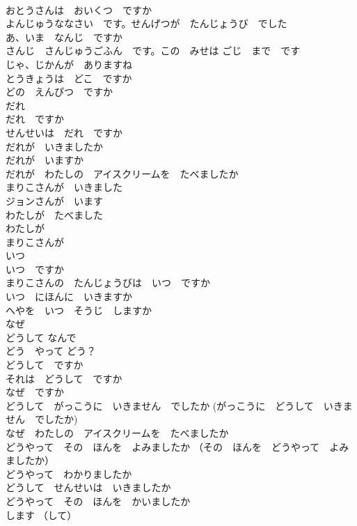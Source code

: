 \documentclass[8pt]{extreport}
\begin{document}
\begin{CJK}{UTF8}{min}
\\	おとうさんは　おいくつ　ですか	
\\	よんじゅうななさい　です。せんげつが　たんじょうび　でした	
\\	あ、いま　なんじ　ですか	
\\	さんじ　さんじゅうごふん　です。この　みせは ごじ　まで　です	
\\	じゃ、じかんが　ありますね	
\\	とうきょうは　どこ　ですか	
\\	どの　えんぴつ　ですか	
\\	だれ	
\\	だれ　ですか	
\\	せんせいは　だれ　ですか	
\\	だれが　いきましたか	
\\	だれが　いますか	
\\	だれが　わたしの　アイスクリームを　たべましたか	
\\	まりこさんが　いきました	
\\	ジョンさんが　います	
\\	わたしが　たべました	
\\	わたしが	
\\	まりこさんが	
\\	いつ	
\\	いつ　ですか	
\\	まりこさんの　たんじょうびは　いつ　ですか	
\\	いつ　にほんに　いきますか	
\\	へやを　いつ　そうじ　しますか	
\\	なぜ	
\\	どうして なんで	
\\	どう　やって どう？	
\\	どうして　ですか	
\\	それは　どうして　ですか	
\\	なぜ　ですか	
\\	どうして　がっこうに　いきません　でしたか (がっこうに　どうして　いきません　でしたか)	
\\	なぜ　わたしの　アイスクリームを　たべましたか	
\\	どうやって　その　ほんを　よみましたか （その　ほんを　どうやって　よみましたか）	
\\	どうやって　わかりましたか	
\\	どうして　せんせいは　いきましたか	
\\	どうやって　その　ほんを　かいましたか	
\\	します （して）	

\end{CJK}
\end{document}
